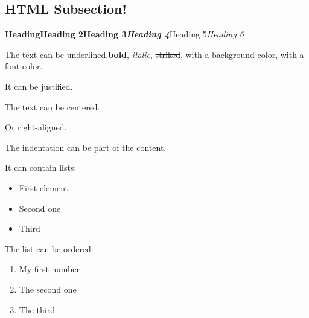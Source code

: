 \documentclass[letter,titlepage,oneside,11pt]{report}%
\begin{document}
\subsection{HTML Subsection!}%
\par%
\par%
\begin{FlushLeft}%
{\huge \textbf{Heading}}{\LARGE \textbf{Heading 2}}{\Large \textbf{Heading 3}}{\large \textit{\textbf{Heading 4}}}{\large Heading 5}{\large \textit{Heading 6}}%
\end{FlushLeft}%
\par%
\begin{FlushLeft}%
The text can be \underline{underlined,}\textbf{bold}, \textit{italic}, \sout{striked}, with a \colorbox[rgb]{0.8,0.8,0.0}{background color}, with a {\color[rgb]{0.5568627450980392,0.26666666666666666,0.6784313725490196}font color.}%
\end{FlushLeft}%
\par%
\begin{justify}%
It can be justified.%
\end{justify}%
\par%
\begin{Center}%
The text can be centered.%
\end{Center}%
\par%
\begin{FlushRight}%
Or right-aligned.%
\end{FlushRight}%
\par%
\begin{FlushLeft}%
The indentation can be part of the content.%
\end{FlushLeft}%
\par%
\begin{FlushLeft}%
It can contain lists:%
\end{FlushLeft}%
\begin{itemize}%
\item First element%
\item Second one%
\item Third%
\end{itemize}%
\par%
\begin{FlushLeft}%
The list can be ordered:%
\end{FlushLeft}%
\begin{enumerate}%
\item My first number%
\item The second one%
\item The third%
\end{enumerate}%
\end{document}
